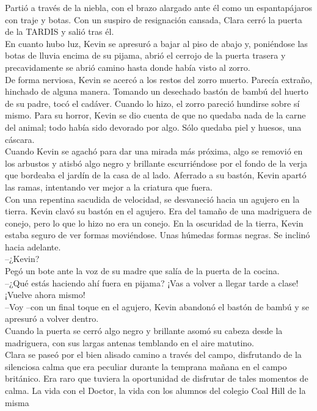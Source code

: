Partió a través de la niebla, con el brazo alargado ante él como un
espantapájaros con traje y botas. Con un suspiro de resignación cansada,
Clara cerró la puerta de la TARDIS y salió tras él.\\[2\baselineskip]En
cuanto hubo luz, Kevin se apresuró a bajar al piso de abajo y,
poniéndose las botas de lluvia encima de su pijama, abrió el cerrojo de
la puerta trasera y precavidamente se abrió camino hasta donde había
visto al zorro.\\
De forma nerviosa, Kevin se acercó a los restos del zorro muerto.
Parecía extraño, hinchado de alguna manera. Tomando un desechado bastón
de bambú del huerto de su padre, tocó el cadáver. Cuando lo hizo, el
zorro pareció hundirse sobre sí mismo. Para su horror, Kevin se dio
cuenta de que no quedaba nada de la carne del animal; todo había sido
devorado por algo. Sólo quedaba piel y huesos, una cáscara.\\
Cuando Kevin se agachó para dar una mirada más próxima, algo se removió
en los arbustos y atisbó algo negro y brillante escurriéndose por el
fondo de la verja que bordeaba el jardín de la casa de al lado. Aferrado
a su bastón, Kevin apartó las ramas, intentando ver mejor a la criatura
que fuera.\\
Con una repentina sacudida de velocidad, se desvaneció hacia un agujero
en la tierra. Kevin clavó su bastón en el agujero. Era del tamaño de una
madriguera de conejo, pero lo que lo hizo no era un conejo. En la
oscuridad de la tierra, Kevin estaba seguro de ver formas moviéndose.
Unas húmedas formas negras. Se inclinó hacia adelante.\\
--¿Kevin?\\
Pegó un bote ante la voz de su madre que salía de la puerta de la
cocina.\\
--¿Qué estás haciendo ahí fuera en pijama? ¡Vas a volver a llegar tarde
a clase! ¡Vuelve ahora mismo!\\
--Voy --con un final toque en el agujero, Kevin abandonó el bastón de
bambú y se apresuró a volver dentro.\\
Cuando la puerta se cerró algo negro y brillante asomó su cabeza desde
la madriguera, con sus largas antenas temblando en el aire
matutino.\\[2\baselineskip]Clara se paseó por el bien alisado camino a
través del campo, disfrutando de la silenciosa calma que era peculiar
durante la temprana mañana en el campo británico. Era raro que tuviera
la oportunidad de disfrutar de tales momentos de calma. La vida con el
Doctor, la vida con los alumnos del colegio Coal Hill de la misma
